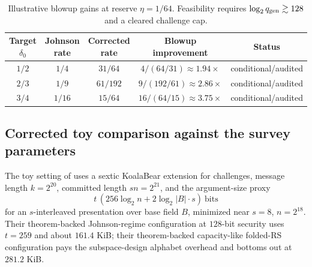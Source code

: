 \documentclass[11pt]{article}
\theoremstyle{definition}
\newcommand{\qgen}{q_{\rm gen}}
\begin{document}
\begin{table}[ht]\centering\small
\caption{Illustrative blowup gains at reserve $\eta=1/64$.  Feasibility requires $\log_2\qgen\gtrsim128$ and a cleared challenge cap.}
\label{tab:blowup}
\begin{tabular}{ccccc}
\toprule
Target $\delta_0$ & Johnson rate & Corrected rate & Blowup improvement & Status \\
\midrule
$1/2$ & $1/4$ & $31/64$ & $4/(64/31)\approx1.94\times$ & conditional/audited \\
$2/3$ & $1/9$ & $61/192$ & $9/(192/61)\approx2.86\times$ & conditional/audited \\
$3/4$ & $1/16$ & $15/64$ & $16/(64/15)\approx3.75\times$ & conditional/audited \\
\bottomrule
\end{tabular}
\end{table}

\subsection{Corrected toy comparison against the survey parameters}
\label{sec:toy-comparison}

The toy setting of \cite{ABF26} uses a sextic KoalaBear extension for challenges, message length $k=2^{20}$, committed length $sn=2^{21}$, and the argument-size proxy
\[
        t\,(256\log_2 n+2\log_2|B|\cdot s)\ \text{bits}
\]
for an $s$-interleaved presentation over base field $B$, minimized near $s=8$, $n=2^{18}$.  Their theorem-backed Johnson-regime configuration at $128$-bit security uses $t=259$ and about $161.4$ KiB; their theorem-backed capacity-like folded-RS configuration pays the subspace-design alphabet overhead and bottoms out at $281.2$ KiB.
\end{document}
